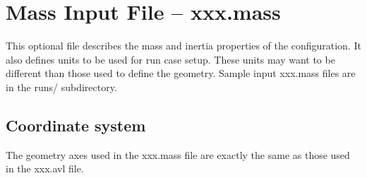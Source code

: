 \section{Mass Input File -- xxx.mass}

This optional file describes the mass and inertia properties of the 
configuration.  It also defines units to be used for run case setup.  
These units may want to be different than those used to define 
the geometry.  Sample input xxx.mass files are in the runs/ subdirectory.

\subsection{Coordinate system}

The geometry axes used in the xxx.mass file are exactly the same
as those used in the xxx.avl file.
%
%
%
%
%
%
%
%
